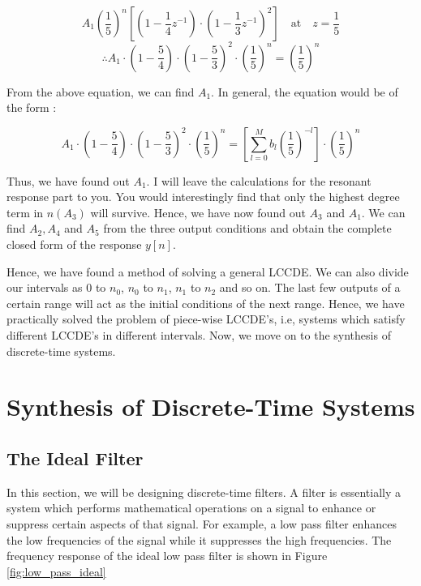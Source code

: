 \documentclass{article}
\theoremstyle{definition}
\begin{document}
\[
    A_1 \left(\frac{1}{5}\right)^n \left[ \left( 1 - \frac{1}{4}z^{-1}  \right) \cdot \left( 1 - \frac{1}{3}z^{-1} \right)^2 \right] \quad \text{at} \quad z= \frac{1}{5}
\]
\[
    \therefore A_1 \cdot \left( 1 - \frac{5}{4}\right) \cdot \left( 1 - \frac{5}{3}\right)^2 \cdot \left(\frac{1}{5} \right)^n = \left( \frac{1}{5}\right)^n
\]

From the above equation, we can find $A_1$. In general, the equation would be of the form :

\[
    A_1 \cdot \left( 1 - \frac{5}{4}\right) \cdot \left( 1 - \frac{5}{3}\right)^2 \cdot \left(\frac{1}{5} \right)^n =  \left[ \sum_{l=0}^{M} b_l \left(\frac{1}{5} \right)^{-l}\right] \cdot \left( \frac{1}{5}\right)^n 
\]

Thus, we have found out $A_1$. I will leave the calculations for the resonant response part to you. You would interestingly find that only the highest degree term in $n (A_3)$ will survive. Hence, we have now found out $A_3$ and $A_1$. We can find $A_2, A_4$ and $A_5$ from the three output conditions and obtain the complete closed form of the response $y[n]$. \smallskip

Hence, we have found a method of solving a general LCCDE. We can also divide our intervals as $0$ to $n_0$, $n_0$ to $n_1$, $n_1$ to $n_2$ and so on. The last few outputs of a certain range will act as the initial conditions of the next range. Hence, we have practically solved the problem of piece-wise LCCDE's, i.e, systems which satisfy different LCCDE's in different intervals.
Now, we move on to the synthesis of discrete-time systems.

\section{Synthesis of Discrete-Time Systems}

\subsection{The Ideal Filter}

In this section, we will be designing discrete-time filters. A filter is essentially a system which performs mathematical operations on a signal to enhance or suppress certain aspects of that signal. For example, a low pass filter enhances the low frequencies of the signal while it suppresses the high frequencies. The frequency response of the ideal low pass filter is shown in Figure \ref{fig:low_pass_ideal}
\end{document}
